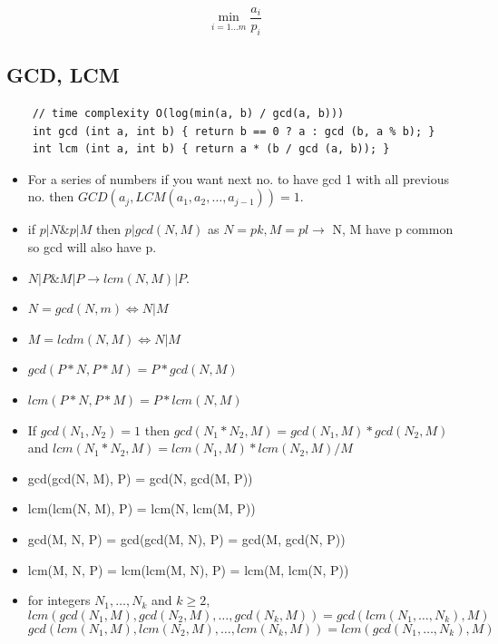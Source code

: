 \documentclass[8pt, a4paper, oneside, twocolumn]{extarticle}
\begin{document}
$$\min_ {i=1 \ldots m} \dfrac{a_i}{p_i}$$
\subsection{GCD, LCM}
\begin{verbatim}
    // time complexity O(log(min(a, b) / gcd(a, b)))
    int gcd (int a, int b) { return b == 0 ? a : gcd (b, a % b); }
    int lcm (int a, int b) { return a * (b / gcd (a, b)); }
\end{verbatim}
\begin{itemize}
    \item For a series of numbers if you want next no. to have gcd 1 with all previous no. then $GCD(a_j, LCM(a_1, a_2, \dots, a_{j - 1})) = 1$.
    \item if $p|N \& p|M$ then $p|gcd(N, M)$ as $N = pk, M = pl \rightarrow$ N, M have p common so gcd will also have p.
    \item $N|P \& M|P \rightarrow lcm(N, M)|P$.
    \item $N = gcd(N, m) \Leftrightarrow N|M$
    \item $M = lcdm(N, M) \Leftrightarrow N|M$
    \item $gcd(P*N, P*M) = P*gcd(N, M)$
    \item $lcm(P*N, P*M) = P*lcm(N, M)$
    \item If $gcd(N_1, N_2) = 1$ then $gcd(N_1 * N_2, M) = gcd(N_1, M) * gcd(N_2, M)$ and $lcm(N_1*N_2, M) = lcm(N_1, M)*lcm(N_2, M)/M$
    \item gcd(gcd(N, M), P) = gcd(N, gcd(M, P))
    \item lcm(lcm(N, M), P) = lcm(N, lcm(M, P))
    \item gcd(M, N, P) = gcd(gcd(M, N), P) = gcd(M, gcd(N, P))
    \item lcm(M, N, P) = lcm(lcm(M, N), P) = lcm(M, lcm(N, P))
    \item for integers $N_1, \dots, N_k$ and $k \geq 2$, 
    $$lcm(gcd(N_1, M), gcd(N_2, M), \dots, gcd(N_k, M)) = gcd(lcm(N_1, \dots, N_k), M)$$
    $$gcd(lcm(N_1, M), lcm(N_2, M), \dots, lcm(N_k, M)) = lcm(gcd(N_1, \dots, N_k), M)$$
\end{itemize}
\end{document}
